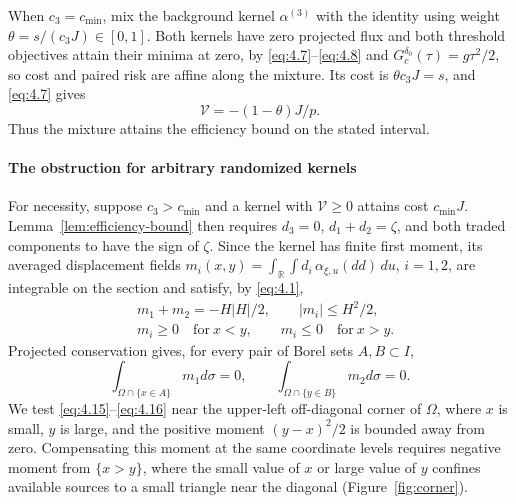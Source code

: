 When \(c_3=c_{\min}\), mix the background kernel \(\alpha^{(3)}\) with the identity using weight \(\theta=s/(c_3J)\in[0,1]\). Both kernels have zero projected flux and both threshold objectives attain their minima at zero, by \eqref{eq:4.7}--\eqref{eq:4.8} and \(G_c^{\delta_0}(\tau)=g\tau^2/2\), so cost and paired risk are affine along the mixture. Its cost is \(\theta c_3J=s\), and \eqref{eq:4.7} gives
\begin{equation}
\mathcal V=-(1-\theta)J/p.
\tag{4.14}\label{eq:4.14}
\end{equation}
Thus the mixture attains the efficiency bound on the stated interval.

\paragraph{The obstruction for arbitrary randomized kernels}\label{par:corner-obstruction}
For necessity, suppose \(c_3>c_{\min}\) and a kernel with \(\mathcal V\ge0\) attains cost \(c_{\min}J\). Lemma~\ref{lem:efficiency-bound} then requires \(d_3=0\), \(d_1+d_2=\zeta\), and both traded components to have the sign of \(\zeta\). Since the kernel has finite first moment, its averaged displacement fields \(m_i(x,y)=\int_{\mathbb R}\int d_i\,\alpha_{\xi,u}(dd)\,du\), \(i=1,2\), are integrable on the section and satisfy, by \eqref{eq:4.1},
\begin{equation}
\begin{aligned}
&m_1+m_2=-H|H|/2,\qquad |m_i|\le H^2/2,\\
&m_i\ge0\quad\text{for}\ x<y,\qquad
m_i\le0\quad\text{for}\ x>y.
\end{aligned}
\tag{4.15}\label{eq:4.15}
\end{equation}
Projected conservation gives, for every pair of Borel sets \(A,B\subset I\),
\begin{equation}
\int_{\Omega\cap\{x\in A\}}m_1d\sigma=0,\qquad
\int_{\Omega\cap\{y\in B\}}m_2d\sigma=0.
\tag{4.16}\label{eq:4.16}
\end{equation}
We test \eqref{eq:4.15}--\eqref{eq:4.16} near the upper-left off-diagonal corner of \(\Omega\), where \(x\) is small, \(y\) is large, and the positive moment \((y-x)^2/2\) is bounded away from zero. Compensating this moment at the same coordinate levels requires negative moment from \(\{x>y\}\), where the small value of \(x\) or large value of \(y\) confines available sources to a small triangle near the diagonal (Figure~\ref{fig:corner}).

